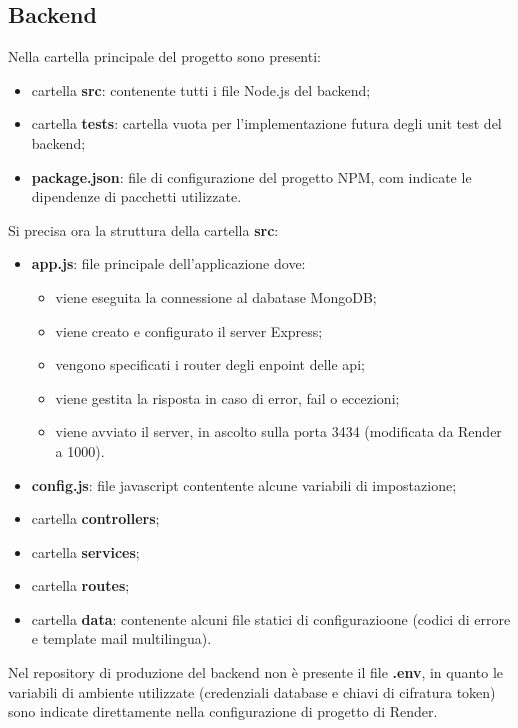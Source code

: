 \documentclass[a4paper]{report}
\begin{document}
\subsection{Backend}
Nella cartella principale del progetto sono presenti:
\begin{itemize}
    \item cartella \textbf{src}: contenente tutti i file Node.js del backend;
    \item cartella \textbf{tests}: cartella vuota per l'implementazione futura degli unit test del backend;
    \item \textbf{package.json}: file di configurazione del progetto NPM, com indicate le dipendenze di pacchetti utilizzate.
\end{itemize}
Si precisa ora la struttura della cartella \textbf{src}:
\begin{itemize}
    \item \textbf{app.js}: file principale dell'applicazione dove:
        \begin{itemize}
            \item viene eseguita la connessione al dabatase MongoDB;
            \item viene creato e configurato il server Express;
            \item vengono specificati i router degli enpoint delle api;
            \item viene gestita la risposta in caso di error, fail o eccezioni;
            \item viene avviato il server, in ascolto sulla porta 3434 (modificata da Render a 1000).
        \end{itemize}
    \item \textbf{config.js}: file javascript contentente alcune variabili di impostazione;
    \item cartella \textbf{controllers};
    \item cartella \textbf{services};
    \item cartella \textbf{routes};
    \item cartella \textbf{data}: contenente alcuni file statici di configurazioone (codici di errore e template mail multilingua).
\end{itemize}
Nel repository di produzione del backend non è presente il file \textbf{.env}, in quanto le variabili di ambiente utilizzate (credenziali database e chiavi di cifratura token) sono indicate direttamente nella configurazione di progetto di Render.
\end{document}
